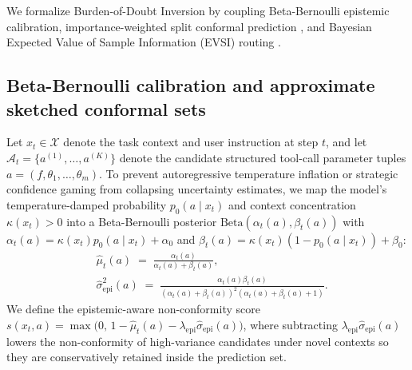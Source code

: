 \documentclass[11pt]{article}
\begin{document}
We formalize Burden-of-Doubt Inversion by coupling Beta-Bernoulli epistemic calibration, importance-weighted split conformal prediction \citep{vovk2005conformal, ren2023knowno}, and Bayesian Expected Value of Sample Information (EVSI) routing \citep{kuhn2023clam, zhang2024clarify, armin2026rescue}.

\subsection{Beta-Bernoulli calibration and approximate sketched conformal sets}

Let $x_t \in \mathcal{X}$ denote the task context and user instruction at step $t$, and let $\mathcal{A}_t = \{a^{(1)},\allowbreak \dots,\allowbreak a^{(K)}\}$ denote the candidate structured tool-call parameter tuples $a = (f,\allowbreak \theta_1,\allowbreak \dots,\allowbreak \theta_m)$. To prevent autoregressive temperature inflation or strategic confidence gaming \citep{arghal2026confidence} from collapsing uncertainty estimates, we map the model's temperature-damped probability $p_0(a \mid x_t)$ and context concentration $\kappa(x_t) > 0$ into a Beta-Bernoulli posterior $\mathrm{Beta}(\alpha_t(a),\allowbreak \beta_t(a))$ with $\alpha_t(a) = \kappa(x_t) p_0(a \mid x_t) + \alpha_0$ and $\beta_t(a) = \kappa(x_t)(1 - p_0(a \mid x_t)) + \beta_0$:
\begin{equation}
\begin{aligned}
&\hat{\mu}_t(a) \;=\; \frac{\alpha_t(a)}{\alpha_t(a) + \beta_t(a)}, \\
&\hat{\sigma}^2_{\mathrm{epi}}(a) \;=\; \frac{\alpha_t(a)\beta_t(a)}{(\alpha_t(a) + \beta_t(a))^2 (\alpha_t(a) + \beta_t(a) + 1)}.
\end{aligned}
\label{eq:bbc}
\end{equation}
We define the epistemic-aware non-conformity score $s(x_t,\allowbreak a) = \max\bigl(0,\allowbreak \, 1 - \hat{\mu}_t(a) - \lambda_{\mathrm{epi}} \hat{\sigma}_{\mathrm{epi}}(a)\bigr)$, where subtracting $\lambda_{\mathrm{epi}}\hat{\sigma}_{\mathrm{epi}}(a)$ lowers the non-conformity of high-variance candidates under novel contexts so they are conservatively retained inside the prediction set.
\end{document}
